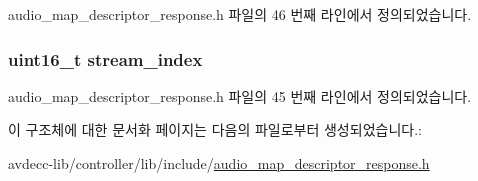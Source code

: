 audio\+\_\+map\+\_\+descriptor\+\_\+response.\+h 파일의 46 번째 라인에서 정의되었습니다.

\subsubsection[{\texorpdfstring{stream\+\_\+index}{stream_index}}]{\setlength{\rightskip}{0pt plus 5cm}uint16\+\_\+t stream\+\_\+index}\hypertarget{structavdecc__lib_1_1audio__map__mapping_acad3919f1d34fc0ae26a5508175defb1}{}\label{structavdecc__lib_1_1audio__map__mapping_acad3919f1d34fc0ae26a5508175defb1}


audio\+\_\+map\+\_\+descriptor\+\_\+response.\+h 파일의 45 번째 라인에서 정의되었습니다.



이 구조체에 대한 문서화 페이지는 다음의 파일로부터 생성되었습니다.\+:\begin{DoxyCompactItemize}
\item 
avdecc-\/lib/controller/lib/include/\hyperlink{audio__map__descriptor__response_8h}{audio\+\_\+map\+\_\+descriptor\+\_\+response.\+h}\end{DoxyCompactItemize}
